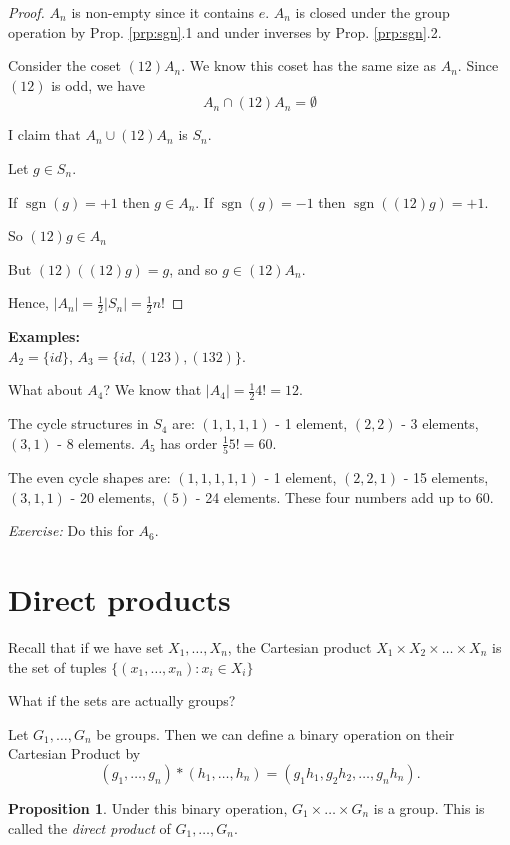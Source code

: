 \documentclass{article}
\theoremstyle{definition}
\newtheorem{proposition}[theorem]{Proposition}
\DeclareMathOperator{\sgn}{sgn}
\begin{document}
\begin{proof}
  $A_n$ is non-empty since it contains $e$. $A_n$ is closed under the group operation by Prop. \ref{prp:sgn}.1 and under inverses by Prop. \ref{prp:sgn}.2.

  Consider the coset $(12) A_n$. We know this coset has the same size as $A_n.$ Since $(1 2)$ is odd, we have
\begin{equation*}
  A_n \cap (1 2) A_n  = \emptyset
\end{equation*}

I claim that $A_n \cup (1 2) A_n $ is $S_n$. 

Let $g \in S_n$.

If $\sgn(g) = +1$ then $g \in A_n$.
If $\sgn(g) = -1$ then $\sgn\left( (12) g \right)= +1$.

So $(12)g \in A_n$

But $(1 2)\left( (1 2) g \right)=g$, and so $g \in (1 2)A_n$.

Hence, $|A_n|=\frac{1}{2}|S_n|=\frac{1}{2}n!$

\end{proof}

\textbf{Examples:}\\
$A_2 = \{ id \}$, $A_3 = \{id, (123), (132)\}$.

What about $A_4$? We know that $|A_4|=\frac{1}{2}4!=12$.

The cycle structures in $S_4$ are:
$(1,1,1,1)$ - 1 element, $(2,2)$ - 3 elements, $(3,1)$ - 8 elements.
$A_5$ has order $\frac{1}{5}5! = 60$.

The even cycle shapes are:
$(1,1,1,1,1)$ - 1 element, $(2,2,1)$ - 15 elements, $(3,1,1)$ - 20 elements, $(5)$ - 24 elements. These four numbers add up to 60.

\emph{Exercise:} Do this for $A_6$.

\section{Direct products}
Recall that if we have set $X_1, \ldots, X_n$, the Cartesian product 
$X_1 \times X_2 \times \ldots \times X_n$ is the set of tuples $\{(x_1, \ldots,x_n) : x_i \in X_i\}$

What if the sets are actually groups?

Let $G_1 , \ldots, G_n$ be groups. Then we can define a binary operation on their Cartesian Product by
$$(g_1, \ldots, g_n) * (h_1, \ldots , h_n) = (g_1h_1, g_2h_2, \ldots, g_nh_n).$$
\begin{proposition}
Under this binary operation, $G_1 \times \ldots \times G_n$ is a group. This is called the \textit{direct product} of $G_1 , \ldots, G_n$.
\end{proposition}
\end{document}
